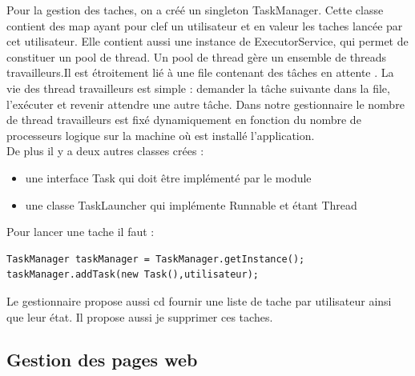 Pour la gestion des taches, on a créé un singleton TaskManager. Cette classe contient des map ayant pour clef un utilisateur et en valeur les taches lancée par cet utilisateur. Elle contient aussi une instance de ExecutorService, qui permet de constituer un pool de thread. Un pool de thread gère un ensemble de threads travailleurs.Il est étroitement lié à une file contenant des tâches en attente . La vie des thread travailleurs est simple : demander la tâche suivante dans la file, l'exécuter et revenir attendre une autre tâche. Dans notre gestionnaire le nombre de thread travailleurs est fixé dynamiquement en fonction du nombre de processeurs logique sur la machine où est installé l'application.\\
De plus il y a deux autres classes crées : \\
\begin{itemize}
\item une interface Task qui doit être implémenté par le module
\item une classe TaskLauncher qui implémente Runnable et étant Thread
\end{itemize}
Pour lancer une tache il faut :
\begin{verbatim}
TaskManager taskManager = TaskManager.getInstance();
taskManager.addTask(new Task(),utilisateur);
\end{verbatim}
Le gestionnaire propose aussi cd fournir une liste de tache par utilisateur ainsi que leur état. Il propose aussi je supprimer ces taches.\\

\subsection{Gestion des pages web}

